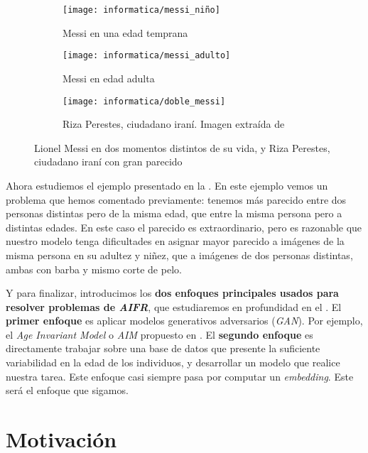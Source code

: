 \begin{figure}[hbtp]
	\centering
	\begin{subfigure}{0.5\textwidth}
		\centering
		\texttt{[image: informatica/messi\_niño]}
		\caption{Messi en una edad temprana}
	\end{subfigure}%
	\begin{subfigure}{.5\textwidth}
		\centering
		\texttt{[image: informatica/messi\_adulto]}
		\caption{Messi en edad adulta}
	\end{subfigure}

	\begin{subfigure}{.6\textwidth}
		\centering
		\texttt{[image: informatica/doble\_messi]}
		\caption{Riza Perestes, ciudadano iraní. Imagen extraída de \cite{informatica:imitador_messi}}
	\end{subfigure}

	\caption{Lionel Messi en dos momentos distintos de su vida, y Riza Perestes, ciudadano iraní con gran parecido}
	\label{img:messi_distintos_otro_adulto}
\end{figure}

Ahora estudiemos el ejemplo presentado en la . En este ejemplo vemos un problema que hemos comentado previamente: tenemos más parecido entre dos personas distintas pero de la misma edad, que entre la misma persona pero a distintas edades. En este caso el parecido es extraordinario, pero es razonable que nuestro modelo tenga dificultades en asignar mayor parecido a imágenes de la misma persona en su adultez y niñez, que a imágenes de dos personas distintas, ambas con barba y mismo corte de pelo.

Y para finalizar, introducimos los \textbf{dos enfoques principales usados para resolver problemas de \textit{AIFR}}, que estudiaremos en profundidad en  el . El \textbf{primer enfoque} es aplicar modelos generativos adversarios (\textit{GAN}). Por ejemplo, el \textit{Age Invariant Model} o \textit{AIM} propuesto en \cite{informatica:tecnica_sintesis_aifr}. El \textbf{segundo enfoque} es directamente trabajar sobre una base de datos que presente la suficiente variabilidad en la edad de los individuos, y desarrollar un modelo que realice nuestra tarea. Este enfoque casi siempre pasa por computar un \textit{embedding}. Este será el enfoque que sigamos.

\section{Motivación}

